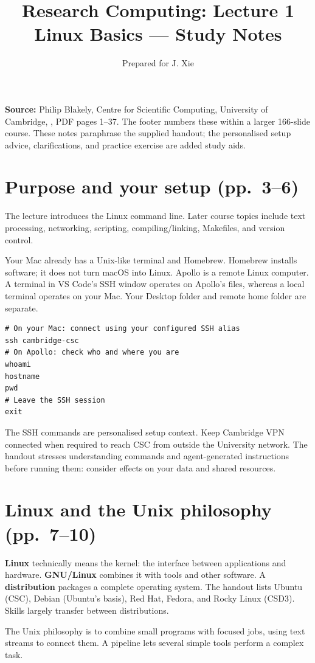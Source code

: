 \documentclass[11pt,a4paper]{article}
\title{Research Computing: Lecture 1\\\large Linux Basics --- Study Notes}
\author{Prepared for J. Xie}\date{}
\begin{document}
\maketitle
\textbf{Source:} Philip Blakely, Centre for Scientific Computing, University of Cambridge, , PDF pages 1--37. The footer numbers these within a larger 166-slide course. These notes paraphrase the supplied handout; the personalised setup advice, clarifications, and practice exercise are added study aids.
\tableofcontents
\section{Purpose and your setup (pp.~3--6)}
The lecture introduces the Linux command line. Later course topics include text processing, networking, scripting, compiling/linking, Makefiles, and version control.

Your Mac already has a Unix-like terminal and Homebrew. Homebrew installs software; it does not turn macOS into Linux. Apollo is a remote Linux computer. A terminal in VS Code's SSH window operates on Apollo's files, whereas a local terminal operates on your Mac. Your Desktop folder and remote home folder are separate.
\begin{lstlisting}
# On your Mac: connect using your configured SSH alias
ssh cambridge-csc
# On Apollo: check who and where you are
whoami
hostname
pwd
# Leave the SSH session
exit
\end{lstlisting}
The SSH commands are personalised setup context. Keep Cambridge VPN connected when required to reach CSC from outside the University network. The handout stresses understanding commands and agent-generated instructions before running them: consider effects on your data and shared resources.
\section{Linux and the Unix philosophy (pp.~7--10)}
\textbf{Linux} technically means the kernel: the interface between applications and hardware. \textbf{GNU/Linux} combines it with tools and other software. A \textbf{distribution} packages a complete operating system. The handout lists Ubuntu (CSC), Debian (Ubuntu's basis), Red Hat, Fedora, and Rocky Linux (CSD3). Skills largely transfer between distributions.

The Unix philosophy is to combine small programs with focused jobs, using text streams to connect them. A pipeline lets several simple tools perform a complex task.
\end{document}
